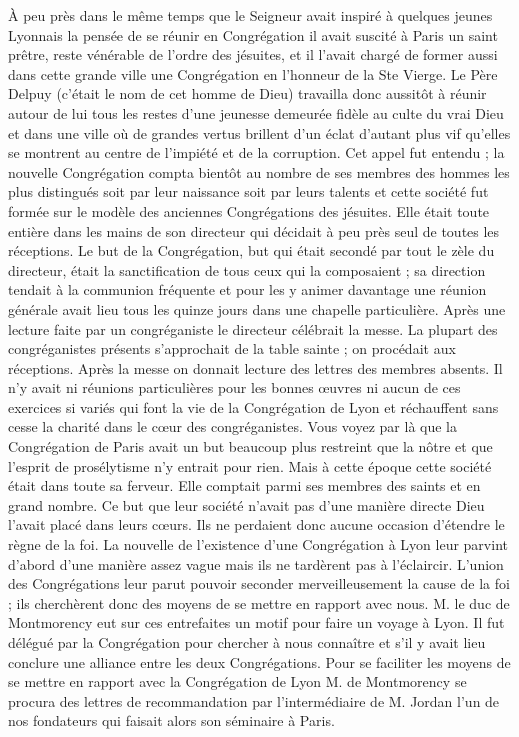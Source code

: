À peu près dans le même temps que le Seigneur avait inspiré à quelques jeunes Lyonnais la pensée de se réunir en Congrégation il avait suscité à Paris un saint prêtre, reste vénérable de l'ordre des jésuites, et il l'avait chargé de former aussi dans cette grande ville une Congrégation en l'honneur de la Ste Vierge. Le Père Delpuy (c'était le nom de cet homme de Dieu) travailla donc aussitôt à réunir autour de lui tous les restes d'une jeunesse demeurée fidèle au culte du vrai Dieu et dans une ville où de grandes vertus brillent d'un éclat d'autant plus vif qu'elles se montrent au centre de l'impiété et de la corruption. Cet appel fut entendu ; la nouvelle Congrégation compta bientôt au nombre de ses membres des hommes les plus distingués soit par leur naissance soit par leurs talents et cette société fut formée sur le modèle des anciennes Congrégations des jésuites. Elle était toute entière dans
les mains de son directeur qui décidait à peu près seul de toutes les réceptions. Le but de la Congrégation, but qui était secondé par tout le zèle du directeur, était la sanctification de tous ceux qui la composaient ; sa direction tendait à la communion fréquente et pour les y animer davantage une réunion générale avait lieu tous les quinze jours dans une chapelle particulière. Après une lecture faite par un congréganiste le directeur célébrait la messe. La plupart des congréganistes présents s'approchait de la table sainte ; on procédait aux réceptions. Après la messe on donnait lecture des lettres des membres absents. Il n'y avait ni réunions particulières pour les bonnes œuvres ni aucun de ces exercices si variés qui font la vie de la Congrégation de Lyon et réchauffent sans cesse la charité dans le cœur des congréganistes. Vous voyez par là que la Congrégation de Paris avait un but beaucoup plus restreint que la nôtre et que l'esprit de prosélytisme n'y entrait pour rien. Mais à cette époque cette société était dans toute sa ferveur. Elle comptait parmi ses membres des saints et en grand nombre. Ce but que leur société n'avait pas d'une manière directe Dieu l'avait placé dans leurs cœurs. Ils ne perdaient donc aucune occasion d'étendre le règne de la foi. La nouvelle de l'existence d'une Congrégation à Lyon leur parvint d'abord d'une manière assez vague mais ils ne tardèrent pas à l'éclaircir. L'union des Congrégations leur parut pouvoir seconder merveilleusement la cause de la foi ; ils cherchèrent donc des moyens de se mettre en rapport avec nous. M. le duc de Montmorency eut sur ces entrefaites un motif pour faire un voyage à Lyon. Il fut délégué par la Congrégation pour chercher à nous connaître et s'il y avait lieu conclure une
alliance entre les deux Congrégations. Pour se faciliter les moyens de se mettre en rapport avec la Congrégation de Lyon M. de Montmorency se procura des lettres de recommandation par l'intermédiaire de M. Jordan l'un de nos fondateurs qui faisait alors son séminaire à Paris.

